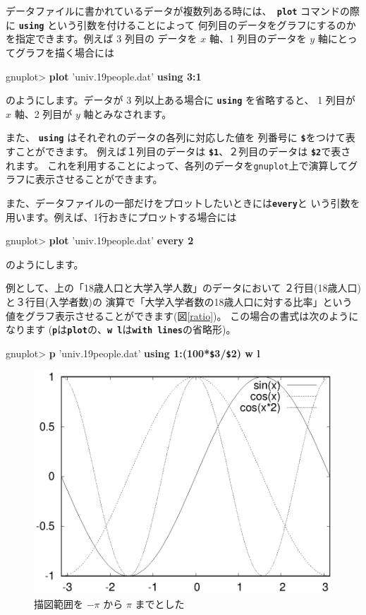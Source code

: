 \documentclass[a4j]{ujarticle} %
\newenvironment{terminal}{%
  \begin{center}
   \begin{minipage}{.8\textwidth}
    \setlength{\FrameSep}{.5\FrameSep}%
    \begin{framed}\ttfamily\small%
     \setlength\baselineskip{.85\baselineskip}%
}{%
    \end{framed}
   \end{minipage}
  \end{center}%
}
\begin{document}
データファイルに書かれているデータが複数列ある時には、{\tt\bf
plot} コマンドの際に {\tt\bf using} という引数を付けることによって
何列目のデータをグラフにするのかを指定できます。例えば 3 列目の
データを $x$ 軸、1 列目のデータを $y$ 軸にとってグラフを描く場合には
\begin{terminal}
gnuplot> {\bf plot} 'univ.19people.dat' {\bf using 3:1}
\end{terminal}
のようにします。データが 3 列以上ある場合に {\tt\bf using} を省略すると、
1 列目が $x$ 軸、2 列目が $y$ 軸とみなされます。

\vspace*{1zw}
また、 {\tt\bf using} はそれぞれのデータの各列に対応した値を
列番号に {\tt\bf \$}をつけて表すことができます。
例えば１列目のデータは {\tt\bf \$1}、２列目のデータは {\tt\bf \$2}で表さ
れます。
これを利用することによって、各列のデータを{\tt gnuplot}上で演算してグラフに表示させることができます。

また、データファイルの一部だけをプロットしたいときには{\tt\bf every}と
いう引数を用います。例えば、1行おきにプロットする場合には
\begin{terminal}
gnuplot> {\bf plot} 'univ.19people.dat' {\bf every 2}
\end{terminal}
のようにします。

例として、上の「18歳人口と大学入学人数」のデータにおいて
２行目(18歳人口)と３行目(入学者数)の
演算で「大学入学者数の18歳人口に対する比率」という値をグラフ表示させることができます(図\ref{ratio})。
この場合の書式は次のようになります
({\tt\bf p}は{\tt\bf plot}の、{\tt\bf w l}は{\tt\bf with lines}の省略形)。

\begin{terminal}
gnuplot> {\bf p} 'univ.19people.dat' {\bf using 1:(100*{\tt \$}3/{\tt \$}2) w l}
\end{terminal}

\begin{figure}
\begin{center}
\begin{minipage}[hbtp]{0.49\textwidth}
\includegraphics[width=\hsize]{sincos2pi.eps}
\caption{描図範囲を $-\pi$ から $\pi$ までとした}
\label{sincos2pi}
\end{minipage}
\end{center}
\end{figure}
\end{document}
